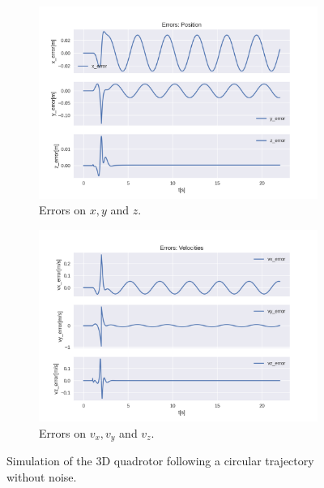 \documentclass{thesisreport}
\begin{document}
\begin{figure}[H]
\medskip
	\begin{subfigure}{0.45\textwidth}
		\includegraphics[width=\linewidth]{Images/acados_simulations/circular_trajectory/3D_quadrotor/Errors_position.png}
		\caption{Errors on $x,y$ and $z$.} \label{fig:3D_sim_errors_pose}
	\end{subfigure}\hspace*{\fill}
	\begin{subfigure}{0.45\textwidth}
		\includegraphics[width=\linewidth]{Images/acados_simulations/circular_trajectory/3D_quadrotor/Errors_velocities.png}
		\caption{Errors on $v_x, v_y$ and $v_z$.} \label{fig:3D_sim_errors_velocities}
	\end{subfigure}

	\caption{Simulation of the 3D quadrotor following a circular trajectory without noise.} \label{fig:3D_sim_circular}
\end{figure}
\end{document}
